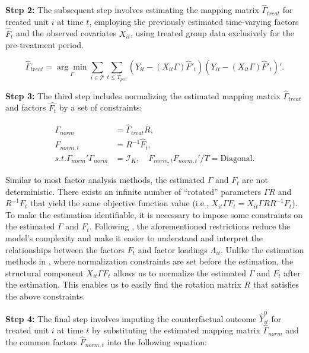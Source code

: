 \documentclass[12pt]{article}
\begin{document}
\textbf{Step 2:} The subsequent step involves estimating the mapping matrix $\hat{\Gamma}_{treat}$ for treated unit $i$ at time $t$, employing the previously estimated time-varying factors $\hat{F}_t$ and the observed covariates $X_{it}$, using treated group data exclusively for the pre-treatment period.

\begin{equation}
\hat{\Gamma}_{treat} = \underset{\Gamma}{\arg\min} \sum_{i \in \mathcal{T}} \sum_{t \leq T_{pre}} \left( Y_{it} - (X_{it} \Gamma) \hat{F}'_{t} \right) \left( Y_{it} - (X_{it} \Gamma) \hat{F}'_{t} \right)'.
\end{equation}

\textbf{Step 3:} The third step includes normalizing the estimated mapping matrix $\hat{\Gamma}_{treat}$ and factors $\hat{F_t}$ by a set of constraints:

\begin{equation}
\label{eqn: normalization}
\begin{aligned}
\Gamma_{norm} &= \hat{\Gamma}_{treat} R, \\
F_{norm, t} &= R^{-1} \hat{F}_t, \\
s.t. \Gamma_{norm}'\Gamma_{norm} &= \mathcal{I}_K, \quad F_{norm, t} F_{norm, t}'/T = \text{Diagonal}.
\end{aligned}
\end{equation}

Similar to most factor analysis methods, the estimated $\Gamma$ and $F_t$ are not deterministic. There exists an infinite number of ``rotated'' parameters $\Gamma R$ and $R^{-1}F_t$ that yield the same objective function value (i.e., $X_{it} \Gamma F_t = X_{it} \Gamma R R^{-1} F_t$). To make the estimation identifiable, it is necessary to impose some constraints on the estimated $\Gamma$ and $F_t$. Following \cite{connor1993test, stock2002forecasting, bai2002determining}, the aforementioned restrictions reduce the model's complexity and make it easier to understand and interpret the relationships between the factors $F_t$ and factor loadings $\Lambda_{it}$. Unlike the estimation methods in \cite{bai2009panel,xu2017generalized}, where normalization constraints are set before the estimation, the structural component $X_{it} \Gamma F_t$ allows us to normalize the estimated $\Gamma$ and $F_t$ after the estimation. This enables us to easily find the rotation matrix $R$ that satisfies the above constraints.

\textbf{Step 4:} The final step involves imputing the counterfactual outcome $\hat{Y}_{it}^0$ for treated unit $i$ at time $t$ by substituting the estimated mapping matrix $\hat{\Gamma}_{norm}$ and the common factors $\hat{F}_{norm, t}$ into the following equation:
\end{document}
